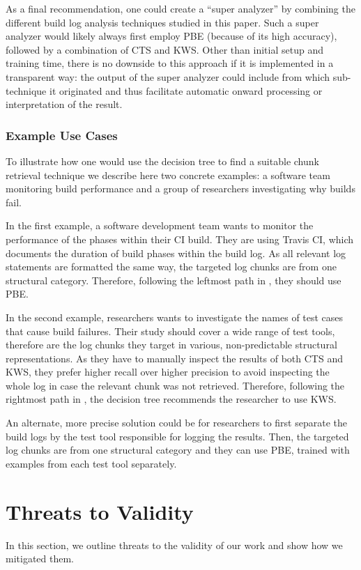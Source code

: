 \documentclass[10pt,journal,compsoc]{IEEEtran}
\begin{document}
As a final recommendation, one could create a ``super analyzer'' by
combining the different build log analysis techniques studied in this
paper.
Such a super analyzer would likely always first employ PBE
(because of its high accuracy), followed by a combination of CTS and
KWS\@.
Other than initial setup and training time, there is no
downside to this approach if it is implemented in a transparent way:
the output of the super analyzer could include from which
sub-technique it originated and thus facilitate automatic onward
processing or interpretation of the result.


\subsubsection{Example Use Cases}
To illustrate how one would use the decision tree to find a suitable
chunk retrieval technique we describe here two concrete examples:
a software team monitoring build performance and a
group of researchers investigating why builds fail.

In the first example, a software development team wants to monitor
the performance of the phases within their CI build.
They are using
Travis CI, which documents the duration of build phases
within the build log.
As all relevant log statements are formatted the same way,
the targeted log chunks are from one structural category.
Therefore, following the leftmost path in
,
they should use PBE.

In the second example, researchers wants to investigate the names
of test cases that cause build failures.
Their study should cover a wide range of test tools, therefore are the
log chunks they target in various, non-predictable structural
representations.
As they have to manually inspect the results of both CTS
and KWS, they prefer higher recall over higher precision to
avoid inspecting
the whole log in case the relevant chunk was not retrieved.
Therefore, following the rightmost path in
,
the decision tree recommends the researcher to use KWS\@.

An alternate, more precise solution
could be for researchers to first separate the build logs by the
test tool responsible for logging the results.
Then, the
targeted log chunks are from one structural category and they can use
PBE, trained with examples from each test tool separately.


\section{Threats to Validity}
In this section, we outline threats to the validity of our work and
show how we mitigated them.
\end{document}
